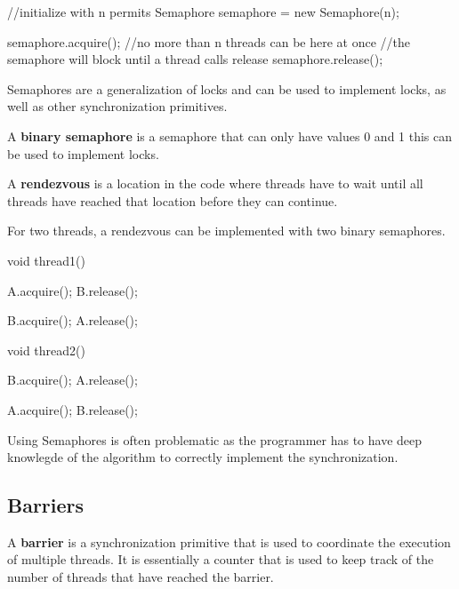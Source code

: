 \begin{codeexample}
//initialize with n permits
Semaphore semaphore = new Semaphore(n);

semaphore.acquire();
    //no more than n threads can be here at once
    //the semaphore will block until a thread calls release
semaphore.release();
\end{codeexample}

\begin{remark}
    Semaphores are a generalization of locks and can be used to implement locks, as well as other synchronization primitives.
\end{remark}

\begin{definition}
    A \textbf{binary semaphore} is a semaphore that can only have values 0 and 1 this can be used to implement locks. 
\end{definition}

\begin{definition}
    A \textbf{rendezvous} is a location in the code where threads have to wait until all threads have reached that location before they can continue.
\end{definition}

\begin{remark}
    For two threads, a rendezvous can be implemented with two binary semaphores.
\end{remark}

\begin{codeexample}
void thread1() {
    A.acquire();
    B.release();

    B.acquire();
    A.release();
}

void thread2() {
    B.acquire(); 
    A.release();

    A.acquire();
    B.release();
}
\end{codeexample}

\begin{important}
    Using Semaphores is often problematic as the programmer has to have deep knowlegde of the algorithm to correctly implement the synchronization.
\end{important}

\subsection{Barriers}

\begin{definition}
    A \textbf{barrier} is a synchronization primitive that is used to coordinate the execution of multiple threads. It is essentially a counter that is used to keep track of the number of threads that have reached the barrier.
\end{definition}

